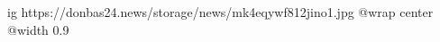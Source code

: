  
 
 
 
 

\ifcmt
  ig https://donbas24.news/storage/news/mk4eqywf812jino1.jpg
  @wrap center
  @width 0.9
\fi
